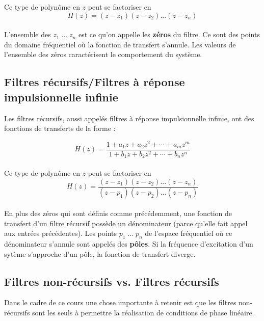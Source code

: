 \documentclass[11pt,a4paper]{article}
\begin{document}
Ce type de polynôme en $z$ peut se factoriser en \\
\[  H(z) =  (z-z_1)(z-z_2)...(z-z_n) \]\\

L'ensemble des $z_1 \; ... \; z_n$ est ce qu'on appelle les \textbf{zéros} du filtre. Ce sont des points du domaine fréquentiel où la fonction de transfert s'annule. Les valeurs de l'ensemble des zéros caractérisent le comportement du système.

\subsection{Filtres récursifs/Filtres à réponse impulsionnelle infinie}
Les filtres récursifs, aussi appelés filtres à réponse impulsionnelle infinie, ont des fonctions de transferts de la forme :

\[ H(z) = \frac{1+ a_1 z + a_2 z^2 + \cdots + a_m z^m }{1+ b_1 z + b_2 z^2 + \cdots + b_n z^n}   \] \\

Ce type de polynôme en $z$ peut se factoriser en \\
\[  H(z) =  \frac{(z-z_1)(z-z_2)...(z-z_n)}{(z-p_1)(z-p_2)...(z-p_n)} \]\\

En plus des zéros qui sont définis comme précédemment, une fonction de transfert d'un filtre récursif possède un dénominateur (parce qu'elle fait appel aux entrées précédentes). Les points $p_1 \; ... \; p_n$ de l'espace fréquentiel où ce dénominateur s'annule sont appelés des \textbf{pôles}. Si la fréquence d'excitation d'un sytème s'approche d'un pôle, la fonction de transfert diverge.

\subsection{Filtres non-récursifs vs. Filtres récursifs}
Dans le cadre de ce cours une chose importante à retenir est que les filtres non-récursifs sont les seuls à permettre la réalisation de conditions de phase linéaire.
\end{document}
